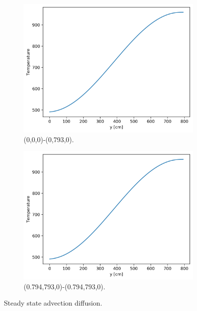 \documentclass[11pt,letterpaper]{article}
\begin{document}
	\begin{figure}[htbp!]
		\centering
		\begin{subfigure}[t]{0.4\textwidth}
			\centering
			\includegraphics[width=\linewidth]{cg-advec2-ssA}
			\caption{(0,0,0)-(0,793,0).}
		\end{subfigure}
		\begin{subfigure}[t]{0.4\textwidth}
			\centering
	        \includegraphics[width=\linewidth]{cg-advec2-ssB}
			\caption{(0.794,793,0)-(0.794,793,0).}
		\end{subfigure}
		\hfill
		\caption{Steady state advection diffusion.}
		\label{fig:cg-advec2-ssA}
	\end{figure}
\end{document}
